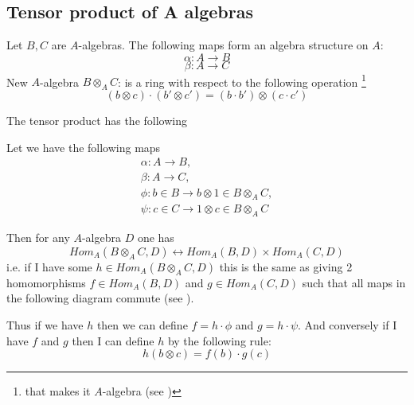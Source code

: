 \subsection{Tensor product of A algebras}

Let $B, C$ are $A$-algebras. The following maps form an algebra
structure on $A$:
\[
\alpha: A \to B
\]
\[
\beta: A \to C
\]
New $A$-algebra $B \otimes_A C$: is a ring with respect to the
following operation
\footnote{
  that makes it $A$-algebra (see )
}
\[
\left(b \otimes c \right) \cdot \left(b' \otimes c'\right) =
\left(b \cdot b'\right) \otimes \left(c \cdot c'\right)
\]

The tensor product has the following 
\begin{definition}
  Let we have the following maps
  \begin{eqnarray}
    \alpha: A \to B,
    \nonumber \\
    \beta: A \to C,
    \nonumber \\
    \phi: b \in B \to b \otimes 1 \in B \otimes_A C,
    \nonumber \\
    \psi: c \in C \to 1 \otimes c \in B \otimes_A C
    \nonumber
  \end{eqnarray}

  Then for any $A$-algebra $D$ one has
  \[
  Hom_A\left(B \otimes_A C, D\right)
  \leftrightarrow
  Hom_A\left(B, D\right) \times
  Hom_A\left(C, D\right)
  \]
  i.e. if I have some 
  $h \in Hom_A\left(B \otimes_A C, D\right)$ this is the same as
  giving 2 homomorphisms
  $f \in Hom_A\left(B, D\right)$ and
  $g \in Hom_A\left(C, D\right)$ such that all maps in the following
  diagram commute (see ).
  

  Thus if we have $h$ then we can define
  $f = h \cdot \phi$ and $g = h \cdot \psi$. And conversely if I have
  $f$ and $g$ then I can define $h$ by the following rule:
  \[
  h\left(b \otimes c\right) = f(b) \cdot g(c)
  \]
\end{definition}

